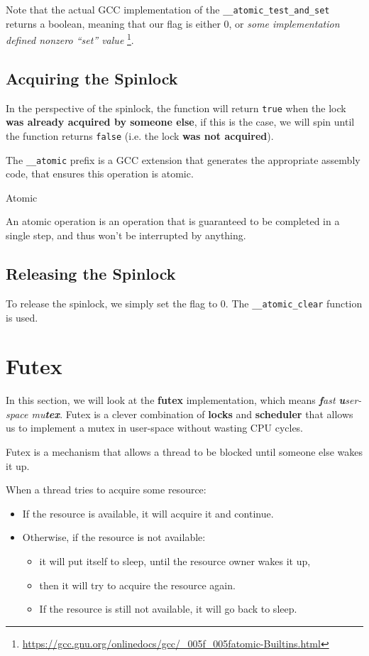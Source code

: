 Note that the actual GCC implementation of the \texttt{\_\_atomic\_test\_and\_set} returns a
boolean, meaning that our flag is either 0, or \textit{some implementation defined nonzero ``set'' value}
\footnote{\url{https://gcc.gnu.org/onlinedocs/gcc/_005f_005fatomic-Builtins.html}}.

\subsection{Acquiring the Spinlock}

In the perspective of the spinlock, the function will return \texttt{true} when the lock
\textbf{was already acquired by someone else}, if this is the case, we will spin until the
function returns \texttt{false} (i.e. the lock \textbf{was not acquired}).

The \texttt{\_\_atomic} prefix is a GCC extension that generates the appropriate assembly code,
that ensures this operation is atomic.

\begin{note*}{Atomic}
    \item An atomic operation is an operation that is guaranteed to be completed in a single step,
    and thus won't be interrupted by anything.
\end{note*}

\subsection{Releasing the Spinlock}

To release the spinlock, we simply set the flag to 0. The \texttt{\_\_atomic\_clear}
function is used.

\section{Futex}

In this section, we will look at the \textbf{futex} implementation, which means
\textit{\textbf{f}ast \textbf{u}ser-space mu\textbf{tex}}. Futex is a clever combination
of \textbf{locks} and \textbf{scheduler} that allows us to implement a mutex in user-space
without wasting CPU cycles.

Futex is a mechanism that allows a thread to be blocked until someone else wakes it up.

When a thread tries to acquire some resource:

\begin{itemize}
    \item If the resource is available, it will acquire it and continue.
    \item Otherwise, if the resource is not available:
          \begin{itemize}
              \item it will put itself to sleep, until the resource owner wakes it up,
              \item then it will try to acquire the resource again.
              \item If the resource is still not available, it will go back to sleep.
          \end{itemize}
\end{itemize}

